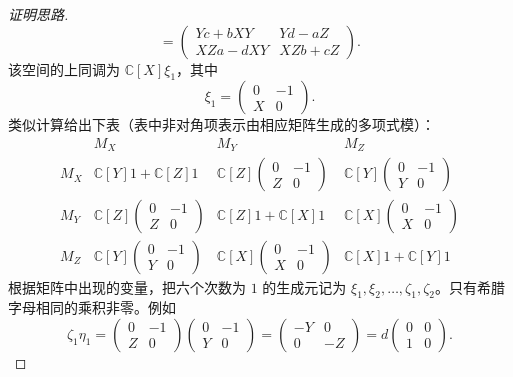 \begin{proof}[证明思路]
\[  =\begin{pmatrix}Yc+bXY&Yd-aZ\\XZa-dXY&XZb+cZ\end{pmatrix}.
\]
该空间的上同调为 $\mathbb C[X]\xi_1$，其中
\[
  \xi_1=\begin{pmatrix}0&-1\\X&0\end{pmatrix}.
\]
类似计算给出下表（表中非对角项表示由相应矩阵生成的多项式模）：
{\small
\[
\begin{array}{c|ccc}
  &M_X&M_Y&M_Z\\\hline
M_X&\mathbb C[Y]1+\mathbb C[Z]1
&\mathbb C[Z]\!\begin{pmatrix}0&-1\\Z&0\end{pmatrix}
&\mathbb C[Y]\!\begin{pmatrix}0&-1\\Y&0\end{pmatrix}\\[5pt]
M_Y&\mathbb C[Z]\!\begin{pmatrix}0&-1\\Z&0\end{pmatrix}
&\mathbb C[Z]1+\mathbb C[X]1
&\mathbb C[X]\!\begin{pmatrix}0&-1\\X&0\end{pmatrix}\\[5pt]
M_Z&\mathbb C[Y]\!\begin{pmatrix}0&-1\\Y&0\end{pmatrix}
&\mathbb C[X]\!\begin{pmatrix}0&-1\\X&0\end{pmatrix}
&\mathbb C[X]1+\mathbb C[Y]1
\end{array}
\]
}
根据矩阵中出现的变量，把六个次数为 $1$ 的生成元记为 $\xi_1,\xi_2,\ldots,\zeta_1,\zeta_2$。只有希腊字母相同的乘积非零。例如
\[
  \zeta_1\eta_1=
  \begin{pmatrix}0&-1\\Z&0\end{pmatrix}
  \begin{pmatrix}0&-1\\Y&0\end{pmatrix}
  =\begin{pmatrix}-Y&0\\0&-Z\end{pmatrix}
  =d\begin{pmatrix}0&0\\1&0\end{pmatrix}.
\]
\end{proof}
